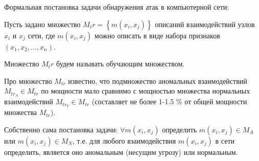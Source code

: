 \documentclass[12pt,a4paper]{article}
\begin{document}
Формальная постановка задачи обнаружения атак в компьютерной сети:

Пусть задано множество $M_tr = \left\{m(x_i, x_j)\right\}$ описаний взаимодействий узлов $x_i$ и $x_j$ сети, где $m(x_i, x_j)$ можно описать в виде набора признаков $(x_1, x_2, ..., x_n)$.


Множество $M_tr$ будем называть обучающим множеством.

Про множество $M_{tr}$ известно, что подмножество аномальных взаимодействий 
$M_{tr_A} \in M_{tr}$ по мощности мало сравнимо с мощностью множества 
нормальных взаимодействий $M_{tr_T} \in M_{tr}$ 
(составляет не более 1-1.5 \% от общей мощности множества $M_{tr}$). 


Собственно сама постановка задачи:
$\forall m(x_i, x_j)$ определить $m(x_i, x_j) \in M_A$ 
или $m(x_i, x_j) \in M_N$, т.е. для любого 
взаимодействия $m(x_i, x_j)$ в сети определить, 
является оно аномальным (несущим угрозу) или нормальным.
\end{document}
